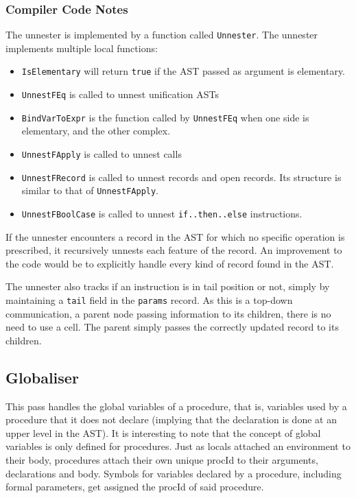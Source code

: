 \documentclass[a4paper]{memoir}
\begin{document}
\subsubsection{Compiler Code Notes}
The unnester is implemented by a function called \lstinline!Unnester!. The unnester implements multiple local functions:
\begin{itemize}
  \item  \lstinline!IsElementary! will return \lstinline!true! if the AST passed as argument is elementary.
  \item  \lstinline!UnnestFEq! is called to unnest unification ASTs
  \item  \lstinline!BindVarToExpr! is the function called by \lstinline!UnnestFEq! when one side is elementary, and the other complex.
  \item  \lstinline!UnnestFApply! is called to unnest calls
  \item  \lstinline!UnnestFRecord! is called to unnest records and open records. Its structure is similar to that of \lstinline!UnnestFApply!.
  \item  \lstinline!UnnestFBoolCase! is called to unnest \lstinline!if..then..else! instructions.
\end{itemize}
If the unnester encounters a record in the AST for which no specific operation is prescribed, it recursively unnests each feature of the record.
An improvement to the code would be to explicitly handle every kind of record
found in the AST.

The unnester also tracks if an instruction is in tail position or not, simply by
maintaining a \lstinline!tail! field in the \lstinline!params! record. As this
is a top-down communication, a parent node passing information to its children,
there is no need to use a cell. The parent simply passes the correctly updated
record to its children.

\subsection{Globaliser}\label{sec:arch:globaliser}            
This pass handles the global variables of a procedure, that is, variables used
by a procedure that it does not declare (implying that the declaration is done
at an upper level in the AST). It is interesting to note that the concept of global variables is only defined for procedures.
Just as locals attached an environment to their body, procedures attach their own unique procId to their arguments, declarations and body.
Symbols for variables declared by a procedure, including formal parameters, get assigned the procId of said procedure.
\end{document}
